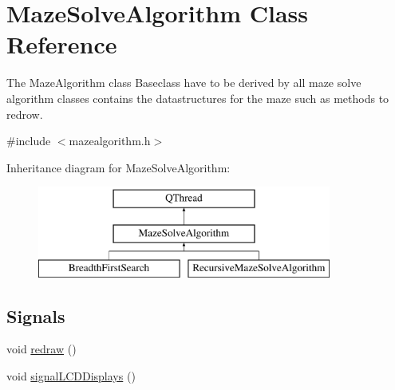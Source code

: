 \hypertarget{class_maze_solve_algorithm}{\section{Maze\-Solve\-Algorithm Class Reference}
\label{class_maze_solve_algorithm}
}


The Maze\-Algorithm class Baseclass have to be derived by all maze solve algorithm classes contains the datastructures for the maze such as methods to redrow.  




{\ttfamily \#include $<$mazealgorithm.\-h$>$}

Inheritance diagram for Maze\-Solve\-Algorithm\-:\begin{figure}[H]
\begin{center}
\leavevmode
\includegraphics[height=3.000000cm]{class_maze_solve_algorithm}
\end{center}
\end{figure}
\subsection*{Signals}
\begin{DoxyCompactItemize}
\item 
void \hyperlink{class_maze_solve_algorithm_ad2903ca429a66b0f7558e169ff2c47c3}{redraw} ()
\item 
void \hyperlink{class_maze_solve_algorithm_abe3dc4ab4896e39d9ce9bc34138bb138}{signal\-L\-C\-D\-Displays} ()
\end{DoxyCompactItemize}
